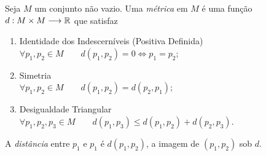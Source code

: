 \begin{defi}
	Seja $M$ um conjunto não vazio. Uma \emph{métrica} em $M$ é uma função $d: M \times M \longrightarrow \mathbb{R}$ que satisfaz
	\begin{enumerate}
	\item Identidade dos Indescerníveis (Positiva Definida)\\
	$\forall p_1,p_2 \in M \qquad d(p_1,p_2)=0 \Leftrightarrow p_1=p_2$;
	\item Simetria \\
	$\forall p_1,p_2 \in M \qquad d(p_1,p_2)=d(p_2,p_1)$;
	\item Desigualdade Triangular \\
	$\forall p_1,p_2,p_3 \in M \qquad d(p_1,p_3) \leq d(p_1,p_2) + d(p_2,p_3)$.
	\end{enumerate}
	A \emph{distância} entre $p_1$ e $p_1$ é $d(p_1,p_2)$, a imagem de $(p_1,p_2)$ sob $d$.
\end{defi}

